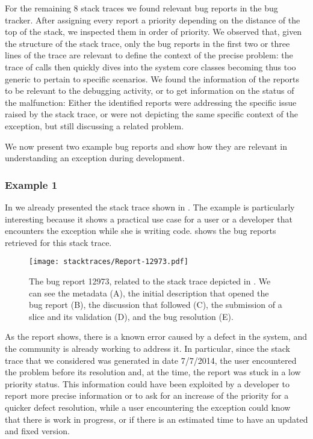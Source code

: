 For the remaining 8 stack traces we found relevant bug reports in the bug tracker.
After assigning every report a priority depending on the distance of the top of the stack, we inspected them in order of priority.
We observed that, given the structure of the stack trace, only the bug reports in the first two or three lines of the trace are relevant to define the context of the precise problem: the trace of calls then quickly dives into the system core classes becoming thus too generic to pertain to specific scenarios.
We found the information of the reports to be relevant to the debugging activity, or to get information on the status of the malfunction: Either the identified reports were addressing the specific issue raised by the stack trace, or were not depicting the same specific context of the exception, but still discussing a related problem.

We now present two example bug reports and show how they are relevant in understanding an exception during development.


\subsubsection{Example 1}

In  we already presented the stack trace shown in .
The example is particularly interesting because it shows a practical use case for a user or a developer that encounters the exception while she is writing code.
 shows the bug reports retrieved for this stack trace.

\begin{figure}[t]
\begin{center}
  \texttt{[image: stacktraces/Report-12973.pdf]}
  \caption{The bug report 12973, related to the stack trace depicted in .
We can see the metadata (A), the initial description that opened the bug report (B), the discussion that followed (C), the submission of a slice and its validation (D), and the bug resolution (E).}
  \label{fig:report}
\end{center}
\end{figure}

As the report shows, there is a known error caused by a defect in the system, and the community is already working to address it.
In particular, since the stack trace that we considered was generated in date 7/7/2014, the user encountered the problem before its resolution and, at the time, the report was stuck in a low priority status.
This information could have been exploited by a developer to report more precise information or to ask for an increase of the priority for a quicker defect resolution, while a user encountering the exception could know that there is work in progress, or if there is an estimated time to have an updated and fixed version.

